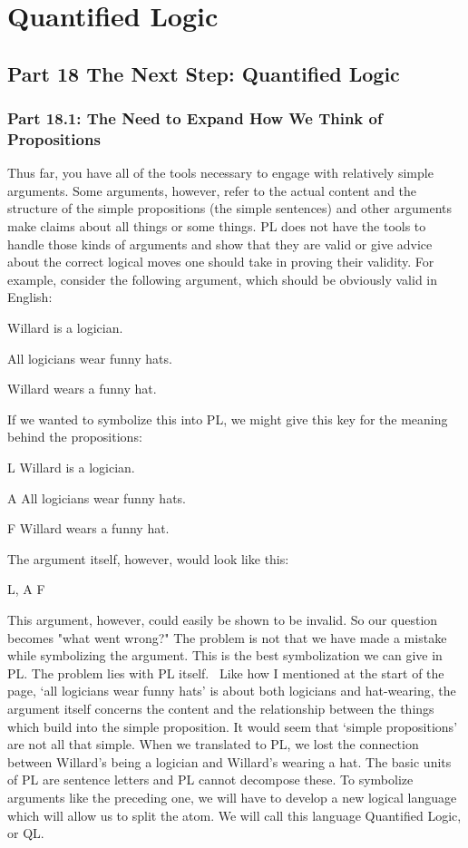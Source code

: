 \part{Quantified Logic}
\label{ch.qlsymbolizing}
\chapter{Part 18 The Next Step: Quantified Logic}
\section{Part 18.1: The Need to Expand How We Think of Propositions}
\setcounter{Example}{0}
Thus far, you have all of the tools necessary to engage with relatively simple arguments. Some arguments, however, refer to the actual content and the structure of the simple propositions (the simple sentences) and other arguments make claims about all things or some things. PL does not have the tools to handle those kinds of arguments and show that they are valid or give advice about the correct logical moves one should take in proving their validity. For example, consider the following argument, which should be obviously valid in English:
\begin{earg}
\item[]Willard is a logician.
\item[]All logicians wear funny hats.
\item[\therefore]  Willard wears a funny hat.
\end{earg}
If we wanted to symbolize this into PL, we might give this key for the meaning behind the propositions: 
\begin{ekey}
\item[L] Willard is a logician.
\item[A] All logicians wear funny hats.
\item[F] Willard wears a funny hat.
\end{ekey}
The argument itself, however, would look like this:
\begin{center}
L, A \therefore  F
\end{center}
This argument, however, could easily be shown to be invalid. So our question becomes "what went wrong?" The problem is not that we have made a mistake while symbolizing the argument. This is the best symbolization we can give in PL. The problem lies with PL itself.  Like how I mentioned at the start of the page, ‘all logicians wear funny hats’ is about both logicians and hat-wearing, the argument itself concerns the content and the relationship between the things which build into the simple proposition. It would seem that ‘simple propositions' are not all that simple. When we translated to PL, we lost the connection between Willard’s being a logician and Willard’s wearing a hat. The basic units of PL are sentence letters and PL cannot decompose these. To symbolize arguments like the preceding one, we will have to develop a new logical language which will allow us to split the atom. We will call this language Quantified Logic, or QL.


